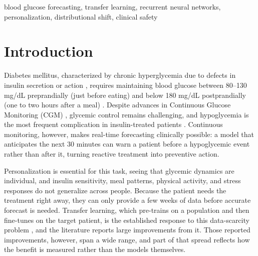 \documentclass[conference]{IEEEtran}
\begin{document}
\begin{IEEEkeywords}
blood glucose forecasting, transfer learning, recurrent neural networks,
personalization, distributional shift, clinical safety
\end{IEEEkeywords}

\section{Introduction}
\label{sec:intro}

Diabetes mellitus, characterized by chronic hyperglycemia due to defects in
insulin secretion or action \cite{10.2337/dc10-S062}, requires maintaining blood
glucose between 80--130 mg/dL preprandially (just before eating) and below
180 mg/dL postprandially (one to two hours after a meal) \cite{10.2337/dc25-S006}.
Despite advances in Continuous Glucose Monitoring (CGM)
\cite{Practical-aspects-of-diabetes-technology}, glycemic control remains
challenging, and hypoglycemia is the most frequent complication in
insulin-treated patients \cite{glucose-monitoring-system}. Continuous monitoring,
however, makes real-time forecasting clinically possible: a model that
anticipates the next 30 minutes can warn a patient before a hypoglycemic event
rather than after it, turning reactive treatment into preventive action.

Personalization is essential for this task, seeing that glycemic dynamics are individual, and
insulin sensitivity, meal patterns, physical activity, and stress responses do
not generalize across people. Because the patient needs the treatment right away, they can only provide a few weeks of data before accurate forecast is needed. Transfer learning, which pre-trains on a
population and then fine-tunes on the target patient, is the established response
to this data-scarcity problem \cite{CUI9474665, Zhu2020Dilated}, and the
literature reports large improvements from it. Those reported improvements,
however, span a wide range, and part of that spread reflects how the benefit is
measured rather than the models themselves.
\end{document}
